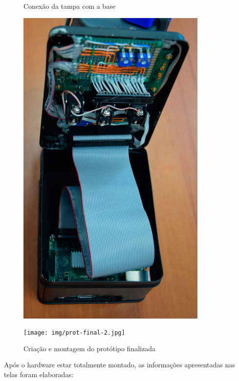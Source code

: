 \begin{figure}[htb]
	\centering
 	\begin{minipage}{0.45\textwidth}
		\centering
		\caption{\label{fig:tampa-base}Conexão da tampa com a base}
		\includegraphics[width=0.84\textwidth]{img/tampa-base.jpg}
	\end{minipage}
	\hfill
	\begin{minipage}{0.45\textwidth}
		\centering
		\caption{\label{fig:prot-final}Criação e montagem do protótipo finalizada}
		\texttt{[image: img/prot-final-2.jpg]}
	\end{minipage}
\end{figure}

Após o hardware estar totalmente montado, as informações apresentadas nas telas foram elaboradas:


